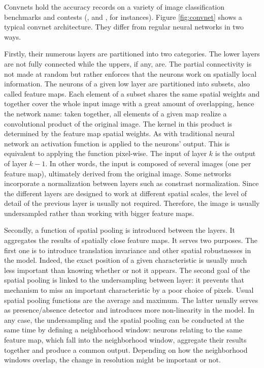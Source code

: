 \documentclass[a4paper]{report}
\begin{document}
Convnets hold the accuracy records on a variety of image classification benchmarks and contests (\cite{ImagenetRecord}, \cite{convnetRecord} and \cite{bestcifar}, for instances). Figure \ref{fig:convnet} shows a typical convnet architecture. They differ from regular neural networks in two ways.
\par
Firstly, their numerous layers are partitioned into two categories. The lower layers are not fully connected while the uppers, if any, are. The partial connectivity is not made at random but rather enforces that the neurons work on spatially local information. The neurons of a given low layer are partitioned into subsets, also called feature maps. Each element of a subset shares the same spatial weights and together cover the whole input image with a great amount of overlapping, hence the network name: taken together, all elements of a given map realize a convolutional product of the original image. The kernel in this product is determined by the feature map spatial weights. As with traditional neural network an activation function is applied to the neurons' output. This is equivalent to applying the function pixel-wise.  The input of layer $k$ is the output of layer $k-1$. In other words, the input is composed of several images (one per feature map), ultimately derived from the original image. Some networks incorporate a normalization between layers such as constrast normalization. Since the different layers are designed to work at different spatial scales, the level of detail of the previous layer is usually not required. Therefore, the image is usually undersampled rather than working with bigger feature maps.
\par
Secondly, a function of spatial pooling is introduced between the layers. It aggregates the results of spatially close feature maps. It serves two purposes. The first one is to introduce translation invariance and other spatial robustnesses in the model. Indeed, the exact position of a given characteristic is usually much less important than knowing whether or not it appears. The second goal of the spatial pooling is linked to the undersampling between layer: it prevents that mechanism to miss an important characteristic by a poor choice of pixels. Usual spatial pooling functions are the average and maximum. The latter usually serves as presence/absence detector and introduces more non-linearity in the model. In any case, the undersampling and the spatial pooling can be conducted at the same time by defining a neighborhood window: neurons relating to the same feature map, which fall into the neighborhood window, aggregate their results together and produce a common output. Depending on how the neighborhood windows overlap, the change in resolution might be important or not.
\end{document}
